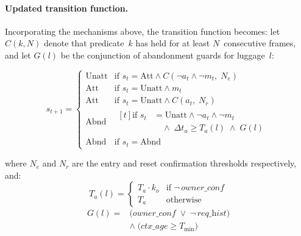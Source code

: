 \paragraph{Updated transition function.}

Incorporating the mechanisms above, the transition function becomes: let $C(k,
	N)$ denote that predicate~$k$ has held for at least $N$~consecutive frames, and
let $G(l)$ be the conjunction of abandonment guards for luggage~$l$:

\begin{small}
	\begin{equation}
		\label{eq:updated_transition}
		s_{t+1} = \begin{cases}
			\text{Unatt} & \text{if } s_t = \text{Att} \wedge C(\neg a_t \wedge \neg m_t,\; N_e)           \\[1ex]
			\text{Att}   & \text{if } s_t = \text{Unatt} \wedge m_t                                        \\
			\text{Att}   & \text{if } s_t = \text{Unatt} \wedge C(a_t,\; N_r)                              \\[1ex]
			\text{Abnd}  & \begin{aligned}[t]
				               \text{if } s_t & = \text{Unatt} \wedge \neg a_t \wedge \neg m_t       \\[-0.5ex]
				                              & \quad \wedge\; \Delta t_u \ge T_a(l) \;\wedge\; G(l)
			               \end{aligned} \\[1ex]
			\text{Abnd}  & \text{if } s_t = \text{Abnd}
		\end{cases}
	\end{equation}
\end{small}

\noindent where $N_e$ and $N_r$ are the entry and reset confirmation thresholds
respectively, and:
\begin{equation}
	T_a(l) = \begin{cases}
		T_a \cdot k_o & \text{if } \neg\, \textit{owner\_conf} \\
		T_a           & \text{otherwise}
	\end{cases}
\end{equation}
\begin{equation}
	\begin{split}
		G(l) ={} & \bigl(\textit{owner\_conf}
		\;\vee\; \neg\,\textit{req\_hist}\bigr) \\
		         & \wedge\;
		\bigl(\textit{ctx\_age} \ge T_{\min}\bigr)
	\end{split}
\end{equation}


